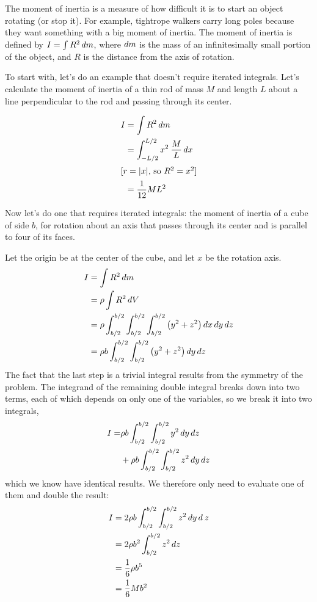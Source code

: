 \begin{eg}
The moment of inertia is a measure of how difficult
it is to start an object rotating (or stop it). For example, tightrope walkers
carry long poles because they want something with a big moment of inertia.
The moment of inertia is defined by $I=\int R^2 \mathop{d\!} m$, where $\mathop{d\!} m$ is
the mass of an infinitesimally small portion of the object, and $R$ is the
distance from the axis of rotation.

To start with, let's do an example that doesn't require iterated integrals.
Let's calculate the moment of inertia of a thin rod of
mass $M$ and length $L$ about a line perpendicular to the rod
and passing through its center.

\begin{align*}
	I	&= \int R^2 \mathop{d\!} m \\
		&= \int_{-L/2}^{L/2} x^2\:\frac{M}{L}\mathop{d\!} x \\
\intertext{[$r=|x|$, so $R^2=x^2$]}
		&= \frac{1}{12}ML^2
\end{align*}

Now let's do one that requires iterated integrals:
the moment of inertia of a cube of side $b$,
for rotation about an axis that passes through its center
and is parallel to four of its faces.

Let the origin be at the center of the cube, and
let $x$ be the rotation axis.
\begin{align*}
	I	&=  \int R^2 \mathop{d\!} m \\
		&= \rho \int R^2 \mathop{d\!} V \\
		&= \rho \int_{b/2}^{b/2} \int_{b/2}^{b/2} \int_{b/2}^{b/2} \left(y^2+z^2\right)
					 \mathop{d\!} x\mathop{d\!} y\mathop{d\!} z \\
		&= \rho b \int_{b/2}^{b/2} \int_{b/2}^{b/2}  \left(y^2+z^2\right)
					 \mathop{d\!} y \mathop{d\!} z 
\end{align*}
The fact that the last step is a trivial integral results
from the symmetry of the problem. The integrand of the
remaining double integral breaks down into two terms, each
of which depends on only one of the variables, so we break
it into two integrals,
\begin{align*}
		I =& \rho b \int_{b/2}^{b/2} \int_{b/2}^{b/2}  y^2 \mathop{d\!} y\mathop{d\!} z \\
			&+ \rho b \int_{b/2}^{b/2} \int_{b/2}^{b/2}  z^2 \mathop{d\!} y\mathop{d\!} z
\end{align*}
which we know have identical results. We therefore only need
to evaluate one of them and double the result:
\begin{align*}
	I	&= 2\rho b \int_{b/2}^{b/2} \int_{b/2}^{b/2}  z^2 \mathop{d\!} y\mathop{d\!}\: z \\
		&= 2 \rho b^2 \int_{b/2}^{b/2} z^2 \mathop{d\!} z \\
		&= \frac{1}{6} \rho b^5 \\
		&= \frac{1}{6} M b^2
\end{align*}
\end{eg}

